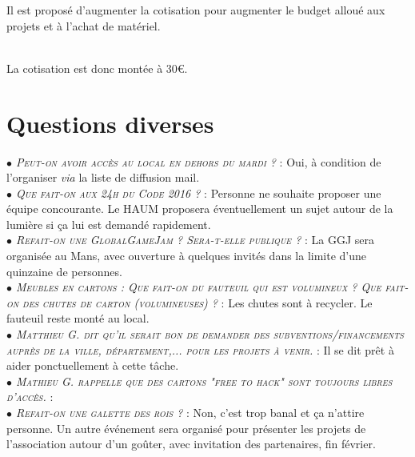 \documentclass[a4paper, 11pt]{article}
\newcommand\question[1]{\textit{\textsc{$\bullet$ #1}} : }
\begin{document}
Il est proposé d'augmenter la cotisation pour augmenter le budget alloué aux projets et à l'achat de matériel.

~\\ La cotisation est donc montée à 30\euro.


\section{Questions diverses}

\question{Peut-on avoir accès au local en dehors du mardi ?} Oui, à condition de l'organiser \textit{via} la liste de diffusion mail.\\
\question{Que fait-on aux 24h du Code 2016 ?} Personne ne souhaite proposer une équipe concourante. Le HAUM proposera éventuellement un sujet autour de la lumière si ça lui est demandé rapidement.\\
\question{Refait-on une GlobalGameJam ? Sera-t-elle publique ?} La GGJ sera organisée au Mans, avec ouverture à quelques invités dans la limite d'une quinzaine de personnes.\\
\question{Meubles en cartons : Que fait-on du fauteuil qui est volumineux ? Que fait-on des chutes de carton (volumineuses) ?} Les chutes sont à recycler. Le fauteuil reste monté au local.\\
\question{Matthieu G. dit qu'il serait bon de demander des subventions/financements auprès de la ville, département,... pour les projets à venir.} Il se dit prêt à aider ponctuellement à cette tâche.\\
\question{Mathieu G. rappelle que des cartons "free to hack" sont toujours libres d'accès.}\\
\question{Refait-on une galette des rois ?} Non, c'est trop banal et ça n'attire personne. Un autre événement sera organisé pour présenter les projets de l'association autour d'un goûter, avec invitation des partenaires, fin février.\\
\end{document}

